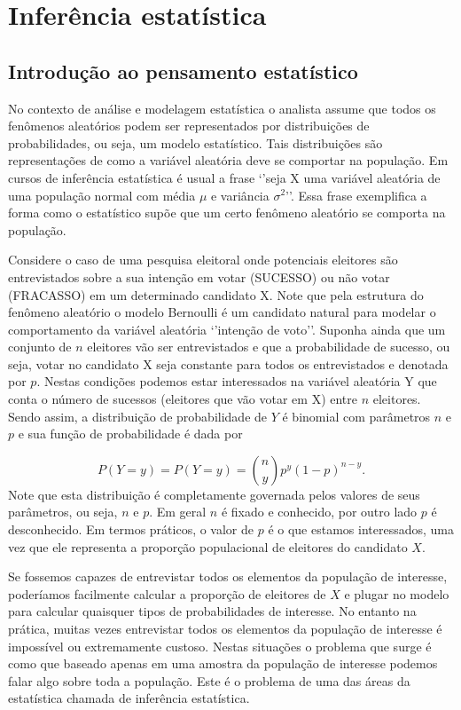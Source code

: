 \documentclass[10pt,a4paper]{book}
\begin{document}
\chapter{Inferência estatística}\label{inferuxeancia-estatuxedstica}

\section{Introdução ao pensamento
estatístico}\label{introduuxe7uxe3o-ao-pensamento-estatuxedstico}

No contexto de análise e modelagem estatística o analista assume que
todos os fenômenos aleatórios podem ser representados por distribuições
de probabilidades, ou seja, um modelo estatístico. Tais distribuições
são representações de como a variável aleatória deve se comportar na
população. Em cursos de inferência estatística é usual a frase `'seja X
uma variável aleatória de uma população normal com média \(\mu\) e
variância \(\sigma^2\)''. Essa frase exemplifica a forma como o
estatístico supõe que um certo fenômeno aleatório se comporta na
população.

Considere o caso de uma pesquisa eleitoral onde potenciais eleitores são
entrevistados sobre a sua intenção em votar (SUCESSO) ou não votar
(FRACASSO) em um determinado candidato X. Note que pela estrutura do
fenômeno aleatório o modelo Bernoulli é um candidato natural para
modelar o comportamento da variável aleatória `'intenção de voto''.
Suponha ainda que um conjunto de \(n\) eleitores vão ser entrevistados e
que a probabilidade de sucesso, ou seja, votar no candidato X seja
constante para todos os entrevistados e denotada por \(p.\) Nestas
condições podemos estar interessados na variável aleatória Y que conta o
número de sucessos (eleitores que vão votar em X) entre \(n\) eleitores.
Sendo assim, a distribuição de probabilidade de \(Y\) é binomial com
parâmetros \(n\) e \(p\) e sua função de probabilidade é dada por

\[
P(Y = y) = P(Y = y) = \binom{n}{y} p^y (1-p)^{n-y}.
\] Note que esta distribuição é completamente governada pelos valores de
seus parâmetros, ou seja, \(n\) e \(p\). Em geral \(n\) é fixado e
conhecido, por outro lado \(p\) é desconhecido. Em termos práticos, o
valor de \(p\) é o que estamos interessados, uma vez que ele representa
a proporção populacional de eleitores do candidato \(X\).

Se fossemos capazes de entrevistar todos os elementos da população de
interesse, poderíamos facilmente calcular a proporção de eleitores de
\(X\) e plugar no modelo para calcular quaisquer tipos de probabilidades
de interesse. No entanto na prática, muitas vezes entrevistar todos os
elementos da população de interesse é impossível ou extremamente
custoso. Nestas situações o problema que surge é como que baseado apenas
em uma amostra da população de interesse podemos falar algo sobre toda a
população. Este é o problema de uma das áreas da estatística chamada de
inferência estatística.
\end{document}
